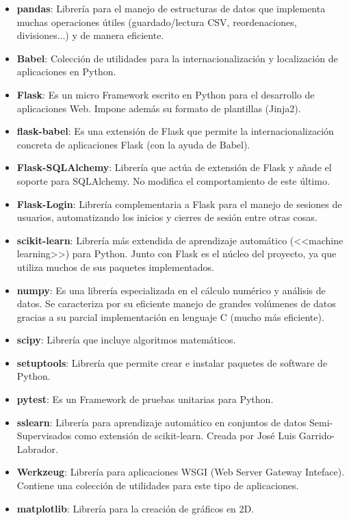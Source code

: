 \begin{itemize}
	\item \textbf{pandas}: Librería para el manejo de estructuras de datos que
	implementa muchas operaciones útiles (guardado/lectura CSV, reordenaciones,
	divisiones...) y de manera eficiente.
	\item \textbf{Babel}: Colección de utilidades para la internacionalización y
	localización de aplicaciones en Python.
	\item \textbf{Flask}: Es un micro Framework escrito en Python para el
	desarrollo de aplicaciones Web. Impone además su formato de plantillas
	(Jinja2).
	\item \textbf{flask-babel}: Es una extensión de Flask que permite la
	internacionalización concreta de aplicaciones Flask (con la ayuda de Babel).
	\item \textbf{Flask-SQLAlchemy}: Librería que actúa de extensión de Flask y
	añade el soporte para SQLAlchemy. No modifica el comportamiento de este
	último.
	\item \textbf{Flask-Login}: Librería complementaria a Flask para el manejo
	de sesiones de usuarios, automatizando los inicios y cierres de sesión entre
	otras cosas.
	\item \textbf{scikit-learn}: Librería más extendida de aprendizaje
	automático (<<machine learning>>) para Python. Junto con Flask es el núcleo
	del proyecto, ya que utiliza muchos de sus paquetes implementados.
	\item \textbf{numpy}: Es una librería especializada en el cálculo numérico y
	análisis de datos. Se caracteriza por su eficiente manejo de grandes
	volúmenes de datos gracias a su parcial implementación en lenguaje C (mucho
	más eficiente).
	\item \textbf{scipy}: Librería que incluye algoritmos matemáticos.
	\item \textbf{setuptools}: Librería que permite crear e instalar paquetes de
	software de Python.
	\item \textbf{pytest}: Es un Framework de pruebas unitarias para Python.
	\item \textbf{sslearn}: Librería para aprendizaje automático en conjuntos de
	datos Semi-Supervisados como extensión de scikit-learn. Creada por José Luis
	Garrido-Labrador.
	\item \textbf{Werkzeug}: Librería para aplicaciones WSGI (Web Server Gateway
	Inteface). Contiene una colección de utilidades para este tipo de
	aplicaciones.
	\item \textbf{matplotlib}: Librería para la creación de gráficos en 2D.

\end{itemize}
